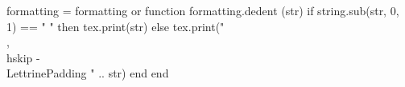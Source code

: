\def\putLettrine#1{\ignorespaces
\write \lettrineslist{#1}\ignorespaces
\expandafter\ifx\csname ltrn#1\endcsname\relax
	\global\expandafter\newcount\csname ltrn#1\endcsname\relax
	\global\csname ltrn#1\endcsname 0
\else
	\global\expandafter\advance\csname ltrn#1\endcsname by 1
\fi
\doifelsefile{lettrines/#1\putzero.mps}
	{\doifelsefile{lettrines/#1\the\csname ltrn#1\endcsname.mps}
		{\ifx#1\plateName\ignorespaces
			\externalfigure[lettrines/#1\the\csname ltrn#1\endcsname.mps][width=\PlateWidth]\ignorespaces
		\else\ignorespaces
			\externalfigure[lettrines/#1\the\csname ltrn#1\endcsname.mps][height=\LettrineSize]\ignorespaces
		\fi}
		{\ifx#1\plateName\ignorespaces
			\externalfigure[lettrines/#1\putzero.mps][width=\PlateWidth]\ignorespaces
		\else\ignorespaces
			\externalfigure[lettrines/#1\putzero.mps][height=\LettrineSize]\ignorespaces
		\fi}}
	{\doifelsefile{lettrines/#1.svg}
		{\externalfigure[lettrines/#1.svg][height=\LettrineSize]\ignorespaces}
		{\doifelsefile{lettrines/#1.pdf}
			{\externalfigure[lettrines/#1.pdf][width=\LettrineSize,height=\LettrineSize]\ignorespaces}
			{\ifx#1\plateName\ignorespaces
					\framed[
						width=\PlateWidth,height=\PlateHeight,
						frame=off,
						background=color,
						backgroundcolor=black,
						frameoffset=0cm,
						foregroundcolor=white]{}\ignorespaces
				\else\ignorespaces
					\framed[
						width=\LettrineSize,height=\LettrineSize,
						frame=off,
						background=color,
						backgroundcolor=black,
						foregroundcolor=white]{\vskip-13.5pt\vbox{\tfd #1}}\ignorespaces
				\fi}\ignorespaces}}}
				

\startluacode
   formatting = formatting or {}
   function formatting.dedent (str)
    if string.sub(str, 0, 1) ==  " " then
      tex.print(str)
    else
      tex.print("\\,\\hskip -\\LettrinePadding " .. str)
    end
  end
\stopluacode

\def\regularLettrine#1#2{\placefigure[left,none]{}{\vskip -5pt\hbox{\putLettrine{#1}\hskip-4pt}\vskip -10pt}\noindent{\sc\ctxlua{formatting.dedent([==[#2]==])}}}

\def\problem#1#2#3{\ignorespaces
\vskip -\LettrineTotalHeight
\hskip -\LettrineTotalWidth \hskip -\parindent \offset[y=\LettrineTotalHeightMinusLine,x=0pt]{\hbox{\putLettrine{#1}}}{\sc\hskip\LettrinePadding \ctxlua{formatting.dedent([==[#2]==])}\ \it #3} \vskip \baselineskip
}

